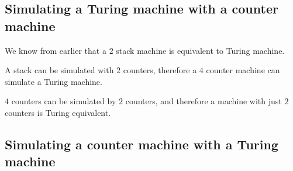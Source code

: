 
\subsection{Simulating a Turing machine with a counter machine}

We know from earlier that a \(2\) stack machine is equivalent to Turing machine.

A stack can be simulated with \(2\) counters, therefore a \(4\) counter machine can simulate a Turing machine.

\(4\) counters can be simulated by \(2\) counters, and therefore a machine with just \(2\) counters is Turing equivalent.

\subsection{Simulating a counter machine with a Turing machine}


